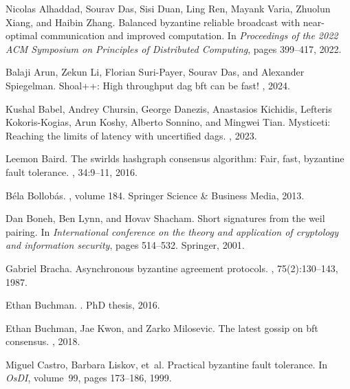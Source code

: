  

\begin{thebibliography}{10}

Nicolas Alhaddad, Sourav Das, Sisi Duan, Ling Ren, Mayank Varia, Zhuolun Xiang,
  and Haibin Zhang.
\newblock Balanced byzantine reliable broadcast with near-optimal communication
  and improved computation.
\newblock In {\em Proceedings of the 2022 ACM Symposium on Principles of
  Distributed Computing}, pages 399--417, 2022.

Balaji Arun, Zekun Li, Florian Suri-Payer, Sourav Das, and Alexander
  Spiegelman.
\newblock Shoal++: High throughput dag bft can be fast!
, 2024.

Kushal Babel, Andrey Chursin, George Danezis, Anastasios Kichidis, Lefteris
  Kokoris-Kogias, Arun Koshy, Alberto Sonnino, and Mingwei Tian.
\newblock Mysticeti: Reaching the limits of latency with uncertified dags.
, 2023.

Leemon Baird.
\newblock The swirlds hashgraph consensus algorithm: Fair, fast, byzantine
  fault tolerance.
, 34:9--11,
  2016.

B{\'e}la Bollob{\'a}s.
, volume 184.
\newblock Springer Science \& Business Media, 2013.

Dan Boneh, Ben Lynn, and Hovav Shacham.
\newblock Short signatures from the weil pairing.
\newblock In {\em International conference on the theory and application of
  cryptology and information security}, pages 514--532. Springer, 2001.

Gabriel Bracha.
\newblock Asynchronous byzantine agreement protocols.
, 75(2):130--143, 1987.

Ethan Buchman.
.
\newblock PhD thesis, 2016.

Ethan Buchman, Jae Kwon, and Zarko Milosevic.
\newblock The latest gossip on bft consensus.
, 2018.

Miguel Castro, Barbara Liskov, et~al.
\newblock Practical byzantine fault tolerance.
\newblock In {\em OsDI}, volume~99, pages 173--186, 1999.


\end{thebibliography}
